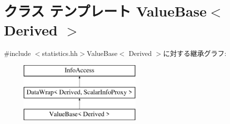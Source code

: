 \hypertarget{classStats_1_1ValueBase}{
\section{クラス テンプレート ValueBase$<$ Derived $>$}
\label{classStats_1_1ValueBase}
}


{\ttfamily \#include $<$statistics.hh$>$}ValueBase$<$ Derived $>$に対する継承グラフ:\begin{figure}[H]
\begin{center}
\leavevmode
\includegraphics[height=3cm]{classStats_1_1ValueBase}
\end{center}
\end{figure}
